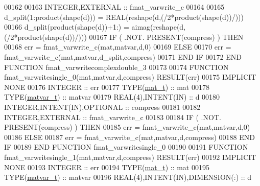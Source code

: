 \begin{DoxyCode}
00162 
00163     \textcolor{keywordtype}{INTEGER},\textcolor{keywordtype}{EXTERNAL}                         :: fmat\_varwrite\_c
00164 
00165     d\_split(1:product(shape(d)))  = \textcolor{keywordtype}{REAL}(reshape(d,(/2*product(shape(d))/)))
00166     d\_split(product(shape(d))+1:) = aimag(reshape(d,(/2*product(shape(d))/)))
00167     \textcolor{keywordflow}{IF} ( .NOT. \textcolor{keyword}{PRESENT}(compress) ) \textcolor{keywordflow}{THEN}
00168         err = fmat\_varwrite\_c(mat,matvar,d,0)
00169     \textcolor{keywordflow}{ELSE}
00170         err = fmat\_varwrite\_c(mat,matvar,d\_split,compress)
00171 \textcolor{keywordflow}{    END IF}
00172 \textcolor{keyword}{END FUNCTION }fmat\_varwritecomplexdouble\_3
00173 
00174 \textcolor{keyword}{FUNCTION }fmat\_varwritesingle\_0(mat,matvar,d,compress) \textcolor{keyword}{RESULT}(err)
00175 \textcolor{keywordtype}{IMPLICIT NONE}
00176     \textcolor{keywordtype}{INTEGER}                                  :: err
00177     \textcolor{keywordtype}{TYPE}(\hyperlink{group___m_a_t_gab0fc888f5a5d79943b16284b1f91c2e8}{mat\_t})                              :: mat
00178     \textcolor{keywordtype}{TYPE}(\hyperlink{group___m_a_t_structmatvar__t}{matvar\_t})                           :: matvar
00179     \textcolor{keywordtype}{REAL(4)},\textcolor{keywordtype}{INTENT(IN)}                    :: d
00180     \textcolor{keywordtype}{INTEGER},\textcolor{keywordtype}{INTENT(IN)},\textcolor{keywordtype}{OPTIONAL}              :: compress
00181 
00182     \textcolor{keywordtype}{INTEGER},\textcolor{keywordtype}{EXTERNAL}                         :: fmat\_varwrite\_c
00183 
00184     \textcolor{keywordflow}{IF} ( .NOT. \textcolor{keyword}{PRESENT}(compress) ) \textcolor{keywordflow}{THEN}
00185         err = fmat\_varwrite\_c(mat,matvar,d,0)
00186     \textcolor{keywordflow}{ELSE}
00187         err = fmat\_varwrite\_c(mat,matvar,d,compress)
00188 \textcolor{keywordflow}{    END IF}
00189 \textcolor{keyword}{END FUNCTION }fmat\_varwritesingle\_0
00190 
00191 \textcolor{keyword}{FUNCTION }fmat\_varwritesingle\_1(mat,matvar,d,compress) \textcolor{keyword}{RESULT}(err)
00192 \textcolor{keywordtype}{IMPLICIT NONE}
00193     \textcolor{keywordtype}{INTEGER}                                  :: err
00194     \textcolor{keywordtype}{TYPE}(\hyperlink{group___m_a_t_gab0fc888f5a5d79943b16284b1f91c2e8}{mat\_t})                              :: mat
00195     \textcolor{keywordtype}{TYPE}(\hyperlink{group___m_a_t_structmatvar__t}{matvar\_t})                           :: matvar
00196     \textcolor{keywordtype}{REAL(4)},\textcolor{keywordtype}{INTENT(IN)},\textcolor{keywordtype}{DIMENSION(:)}          :: d

\end{DoxyCode}
